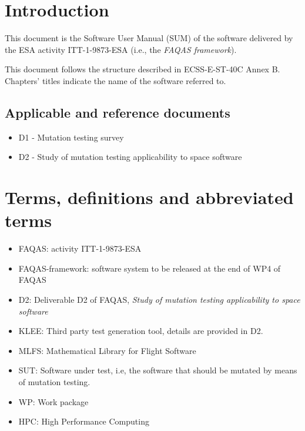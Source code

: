 
\chapter{Introduction}

This document is the Software User Manual (SUM) of the software delivered by the ESA activity ITT-1-9873-ESA (i.e., the \emph{FAQAS framework}).

This document follows the structure described in ECSS-E-ST-40C Annex B. Chapters' titles indicate the name of the software referred to.



\section{Applicable and reference documents}

\begin{itemize}
\item{D1 - Mutation testing survey}
\item{D2 - Study of mutation testing applicability to space software}
\end{itemize}

\chapter{Terms, definitions and abbreviated terms}

\begin{itemize}
\item{FAQAS}: activity ITT-1-9873-ESA
\item{FAQAS-framework}: software system to be released at the end of WP4 of FAQAS
\item{D2}: Deliverable D2 of FAQAS, \emph{Study of mutation testing applicability to space software}
\item{KLEE}: Third party test generation tool, details are provided in D2.
\item{MLFS}: Mathematical Library for Flight Software
\item{SUT}: Software under test, i.e, the software that should be mutated by means of mutation testing.
\item{WP}: Work package
\item{HPC}: High Performance Computing

\end{itemize}

\clearpage
